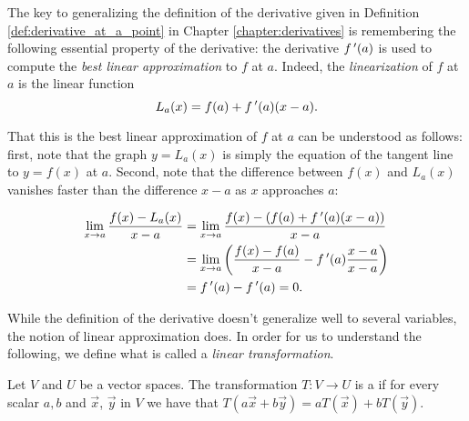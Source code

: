 The key to generalizing the definition of the derivative given in Definition \ref{def:derivative_at_a_point} in Chapter \ref{chapter:derivatives} is remembering the following essential property of the derivative: the derivative $f\,'(a)$ is used to compute the \emph{best linear approximation} to $f$ at $a$. Indeed, the \emph{linearization} of $f$ at $a$ is the linear function
\begin{equation}\label{eq_linearization}
L_a(x) = f(a) +f\,'(a)(x-a).
\end{equation}

That this is the best linear approximation of $f$ at $a$ can be understood as follows: first, note that the graph $y=L_a(x)$ is simply the equation of the tangent line to $y=f(x)$ at $a$. Second, note that the difference between $f(x)$ and $L_a(x)$ vanishes faster than the difference $x-a$ as $x$ approaches $a$:



\begin{align*}
\lim_{x\to a}\frac{f(x)-L_a(x)}{x-a} &= \lim_{x\to a}\frac{f(x)-(f(a)+f\,'(a)(x-a))}{x-a}\\
& = \lim_{x\to a}\left(\frac{f(x)-f(a)}{x-a}-f\,'(a)\frac{x-a}{x-a}\right)\\
& = f\,'(a)-f\,'(a)=0.
\end{align*}



While the definition of the derivative doesn't generalize well to several variables, the notion of linear approximation does. In order for us to understand the following, we define what is called a \textit{linear transformation}. 


{Let $V$ and $U$ be a vector spaces.  The  transformation $T:V\to U$ is a  if for every scalar $a,b$ and $\vec x$, $\vec y$ in $V$ we have that $T(a\vec x+b\vec y) = aT(\vec x)+bT(\vec y)$.}



